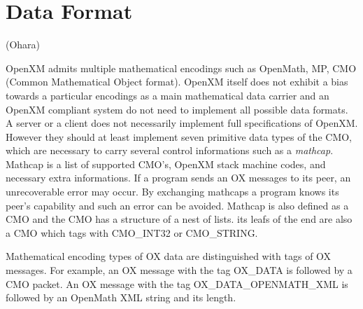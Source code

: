 
\section{Data Format}   (Ohara)

OpenXM admits multiple mathematical encodings such as OpenMath, MP, CMO
(Common Mathematical Object format).
OpenXM itself does not exhibit a bias towards a particular encodings 
as a main mathematical data carrier and an OpenXM compliant system do not need to
implement all possible data formats.
A server or a client does not necessarily implement full specifications
of OpenXM. However  they should at least implement seven primitive 
data types of the CMO, which are necessary to 
carry several control informations such as a {\it mathcap}.
Mathcap is a list of supported CMO's, OpenXM stack machine codes, 
and necessary extra informations.
If a program sends an OX messages to its peer, 
an unrecoverable error may occur. 
By exchanging mathcaps a program knows its peer's capability 
and such an error can be avoided.
Mathcap is also defined as a CMO and the CMO has a structure of a nest
of lists.  its leafs of the end are also a CMO which tags with
CMO\_INT32 or CMO\_STRING.

Mathematical encoding types of OX data are distinguished with tags
of OX messages.
For example,
an OX message with the tag 
OX\_DATA is followed by a CMO packet.
An OX message with the tag 
OX\_DATA\_OPENMATH\_XML is followed by 
an OpenMath XML string and its length.

